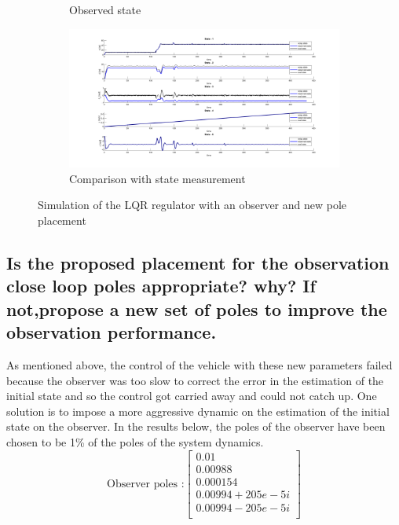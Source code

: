 \begin{figure}[H]
\begin{subfigure}[b]{0.8\textwidth}
         \caption{Observed state}
         \label{fig:2State}
     \end{subfigure}
     \begin{subfigure}[b]{0.8\textwidth}
         \centering
         \includegraphics[width=\textwidth]{Latex report/image/ex2/obs2.png}
         \caption{Comparison with state measurement}
         \label{fig:2Obs}
     \end{subfigure}
    \caption{Simulation of the LQR regulator with an observer and new pole placement}
    \label{fig:sim2}
\end{figure}




\subsection{Is the proposed placement for the observation close loop poles appropriate? why? If not,propose a new set of poles to improve the observation performance.}

As mentioned above, the control of the vehicle with these new parameters failed because the observer was too slow to correct the error in the estimation of the initial state and so the control got carried away and could not catch up. One solution is to impose a more aggressive dynamic on the estimation of the initial state on the observer. In the results below, the poles of the observer have been chosen to be 1\% of the poles of the system dynamics.
\begin{equation}
    \text{Observer poles :}
    \left[\begin{array}{c}
         0.01\\
         0.00988\\
         0.000154\\
         0.00994 + 205e-5i\\
         0.00994 - 205e-5i\\
    \end{array}\right]
\end{equation}

